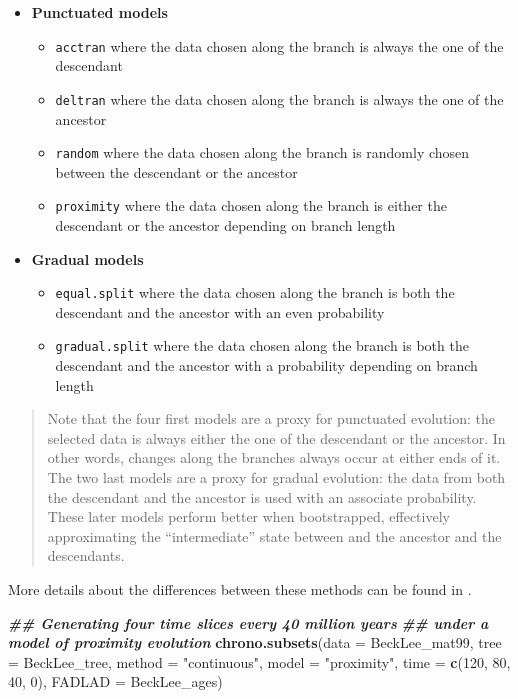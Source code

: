 \documentclass[
]{book}
\newenvironment{Shaded}{\begin{snugshade}}{\end{snugshade}}
\newcommand{\AttributeTok}[1]{\textcolor[rgb]{0.13,0.29,0.53}{#1}}
\newcommand{\DecValTok}[1]{\textcolor[rgb]{0.00,0.00,0.81}{#1}}
\newcommand{\DocumentationTok}[1]{\textcolor[rgb]{0.56,0.35,0.01}{\textbf{\textit{#1}}}}
\newcommand{\FunctionTok}[1]{\textcolor[rgb]{0.13,0.29,0.53}{\textbf{#1}}}
\newcommand{\NormalTok}[1]{#1}
\newcommand{\StringTok}[1]{\textcolor[rgb]{0.31,0.60,0.02}{#1}}
\providecommand{\tightlist}{%
  \setlength{\itemsep}{0pt}\setlength{\parskip}{0pt}}
\begin{document}
\begin{itemize}
\tightlist
\item
  \textbf{Punctuated models}

  \begin{itemize}
  \tightlist
  \item
    \texttt{acctran} where the data chosen along the branch is always the one of the descendant
  \item
    \texttt{deltran} where the data chosen along the branch is always the one of the ancestor
  \item
    \texttt{random} where the data chosen along the branch is randomly chosen between the descendant or the ancestor
  \item
    \texttt{proximity} where the data chosen along the branch is either the descendant or the ancestor depending on branch length
  \end{itemize}
\item
  \textbf{Gradual models}

  \begin{itemize}
  \tightlist
  \item
    \texttt{equal.split} where the data chosen along the branch is both the descendant and the ancestor with an even probability
  \item
    \texttt{gradual.split} where the data chosen along the branch is both the descendant and the ancestor with a probability depending on branch length
  \end{itemize}
\end{itemize}

\begin{quote}
Note that the four first models are a proxy for punctuated evolution: the selected data is always either the one of the descendant or the ancestor.
In other words, changes along the branches always occur at either ends of it.
The two last models are a proxy for gradual evolution: the data from both the descendant and the ancestor is used with an associate probability.
These later models perform better when bootstrapped, effectively approximating the ``intermediate'' state between and the ancestor and the descendants.
\end{quote}

More details about the differences between these methods can be found in \citet{time-slice}.

\begin{Shaded}
\begin{Highlighting}[]
\DocumentationTok{\#\# Generating four time slices every 40 million years}
\DocumentationTok{\#\# under a model of proximity evolution}
\FunctionTok{chrono.subsets}\NormalTok{(}\AttributeTok{data =}\NormalTok{ BeckLee\_mat99, }\AttributeTok{tree =}\NormalTok{ BeckLee\_tree, }
               \AttributeTok{method =} \StringTok{"continuous"}\NormalTok{, }\AttributeTok{model =} \StringTok{"proximity"}\NormalTok{,}
               \AttributeTok{time =} \FunctionTok{c}\NormalTok{(}\DecValTok{120}\NormalTok{, }\DecValTok{80}\NormalTok{, }\DecValTok{40}\NormalTok{, }\DecValTok{0}\NormalTok{),}
               \AttributeTok{FADLAD =}\NormalTok{ BeckLee\_ages)}
\end{Highlighting}
\end{Shaded}
\end{document}
